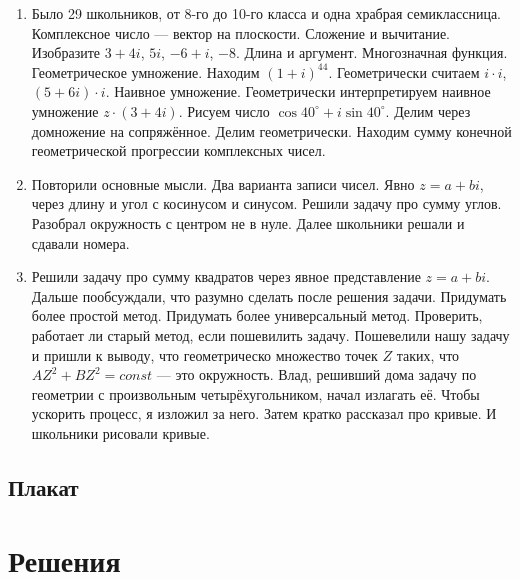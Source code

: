 \documentclass[12pt]{article}
\newcounter{problem}[section]
\theoremstyle{definition}
\begin{document}
\begin{enumerate}
  \item Было 29 школьников, от 8-го до 10-го класса и одна храбрая семиклассница. Комплексное число — вектор на плоскости.
  Сложение и вычитание. Изобразите $3+4i$, $5i$, $-6 + i$, $-8$. Длина и аргумент. Многозначная функция. 
  Геометрическое умножение. Находим $(1+i)^{44}$. Геометрически считаем $i \cdot i$, $(5 + 6i) \cdot i$. Наивное умножение.
  Геометрически интерпретируем наивное умножение $z \cdot (3 + 4i)$.
  Рисуем число $\cos 40^{\circ} + i \sin 40^{\circ}$. Делим через домножение на сопряжённое.
  Делим геометрически. Находим сумму конечной геометрической прогрессии комплексных чисел. 
  \item Повторили основные мысли. Два варианта записи чисел. Явно $z=a + bi$, через длину и угол с косинусом и синусом.
  Решили задачу про сумму углов. Разобрал окружность с центром не в нуле. Далее школьники решали и сдавали номера.
  \item Решили задачу про сумму квадратов через явное представление $z=a+bi$.
  Дальше пообсуждали, что разумно сделать после решения задачи. 
  Придумать более простой метод. Придумать более универсальный метод. 
  Проверить, работает ли старый метод, если пошевилить задачу.
  Пошевелили нашу задачу и пришли к выводу, что геометрическо множество точек $Z$ таких, что
  $AZ^2 + BZ^2 = const$ — это окружность. 
  Влад, решивший дома задачу по геометрии с произвольным четырёхугольником, начал излагать её. 
  Чтобы ускорить процесс, я изложил за него. Затем кратко рассказал про кривые. 
  И школьники рисовали кривые. 


\end{enumerate}

\subsection{Плакат}






\renewenvironment{solution}[1]{%
         \vskip .5cm plus 2cm minus 0.1cm%
         {\bfseries \hyperlink{problem:#1}{#1.}}%
}%
{%
}%



\section{Решения}

\end{document}
